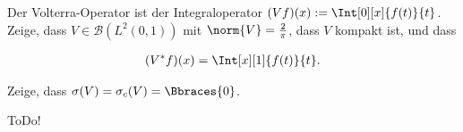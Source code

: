 \begin{exercise}[IO/3]

Der Volterra-Operator ist der Integraloperator $(V f)(x) := \Int[0][x]{f(t)}{t}$.
Zeige, dass $V \in \mathcal{B}(L^2(0, 1))$ mit $\norm{V} = \frac{2}{\pi}$, dass $V$ kompakt ist, und dass

\begin{align*}
  (V^\ast f)(x)
  =
  \Int[x][1]{f(t)}{t}.
\end{align*}

Zeige, dass $\sigma(V) = \sigma_c(V) = \Bbraces{0}$.

\end{exercise}

\begin{solution}

ToDo!

\end{solution}
